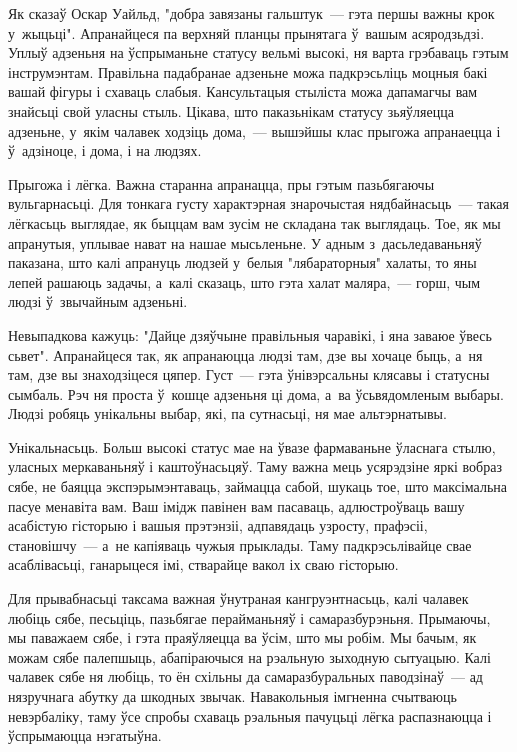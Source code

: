 Як сказаў Оскар Уайльд, "добра завязаны гальштук~--- гэта першы важны крок у~жыцьці". Апранайцеся па верхняй планцы прынятага ў~вашым асяродзьдзі. Уплыў адзеньня на ўспрыманьне статусу вельмі высокі, ня варта грэбаваць гэтым інструмэнтам. Правільна падабранае адзеньне можа падкрэсьліць моцныя бакі вашай фігуры і схаваць слабыя. Кансультацыя стыліста можа дапамагчы вам знайсьці свой уласны стыль. Цікава, што паказьнікам статусу зьяўляецца адзеньне, у~якім чалавек ходзіць дома,~--- вышэйшы клас прыгожа апранаецца і ў~адзіноце, і дома, і на людзях.

Прыгожа і лёгка. Важна старанна апранацца, пры гэтым пазьбягаючы вульгарнасьці. Для тонкага густу характэрная знарочыстая нядбайнасьць~--- такая лёгкасьць выглядае, як быццам вам зусім не складана так выглядаць. Тое, як мы апранутыя, уплывае нават на нашае мысьленьне. У адным з~дасьледаваньняў паказана, што калі апрануць людзей у~белыя "лябараторныя" халаты, то яны лепей рашаюць задачы, а~калі сказаць, што гэта халат маляра,~--- горш, чым людзі ў~звычайным адзеньні.

Невыпадкова кажуць: "Дайце дзяўчыне правільныя чаравікі, і яна заваюе ўвесь сьвет". Апранайцеся так, як апранаюцца людзі там, дзе вы хочаце быць, а~ня там, дзе вы знаходзіцеся цяпер. Густ~--- гэта ўнівэрсальны клясавы і статусны сымбаль. Рэч ня проста ў~кошце адзеньня ці дома, а~ва ўсьвядомленым выбары. Людзі робяць унікальны выбар, які, па сутнасьці, ня мае альтэрнатывы.

Унікальнасьць. Больш высокі статус мае на ўвазе фармаваньне ўласнага стылю, уласных меркаваньняў і каштоўнасьцяў. Таму важна мець усярэдзіне яркі вобраз сябе, не баяцца экспэрымэнтаваць, займацца сабой, шукаць тое, што максімальна пасуе менавіта вам. Ваш імідж павінен вам пасаваць, адлюстроўваць вашу асабістую гісторыю і вашыя прэтэнзіі, адпавядаць узросту, прафэсіі, становішчу~--- а~не капіяваць чужыя прыклады. Таму падкрэсьлівайце свае асаблівасьці, ганарыцеся імі, стварайце вакол іх сваю гісторыю.

Для прывабнасьці таксама важная ўнутраная кангруэнтнасьць, калі чалавек любіць сябе, песьціць, пазьбягае перайманьняў і самаразбурэньня. Прымаючы, мы паважаем сябе, і гэта праяўляецца ва ўсім, што мы робім. Мы бачым, як можам сябе палепшыць, абапіраючыся на рэальную зыходную сытуацыю. Калі чалавек сябе ня любіць, то ён схільны да самаразбуральных паводзінаў~--- ад нязручнага абутку да шкодных звычак. Навакольныя імгненна счытваюць невэрбаліку, таму ўсе спробы схаваць рэальныя пачуцьці лёгка распазнаюцца і ўспрымаюцца нэгатыўна.


